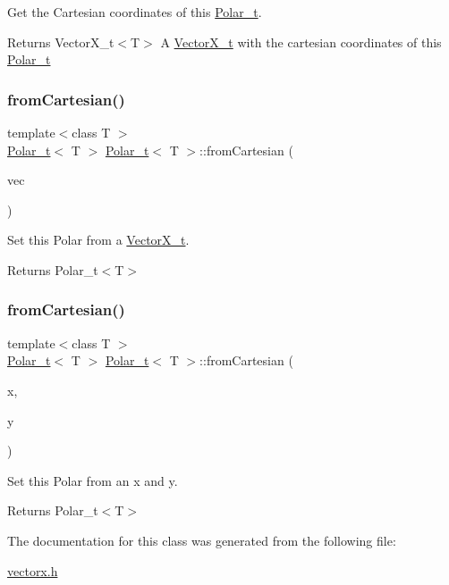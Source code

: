 Get the Cartesian coordinates of this \hyperlink{class_polar__t}{Polar\+\_\+t}. 

\begin{DoxyReturn}{Returns}
Vector\+X\+\_\+t$<$\+T$>$ A \hyperlink{class_vector_x__t}{Vector\+X\+\_\+t} with the cartesian coordinates of this \hyperlink{class_polar__t}{Polar\+\_\+t} 
\end{DoxyReturn}
\mbox{\label{class_polar__t_a7a7ea302869a50342c010083943a2dbc}} 
\subsubsection{\texorpdfstring{from\+Cartesian()}{fromCartesian()}\hspace{0.1cm}{\footnotesize\ttfamily [1/2]}}
{\footnotesize\ttfamily template$<$class T $>$ \\
\hyperlink{class_polar__t}{Polar\+\_\+t}$<$ T $>$ \hyperlink{class_polar__t}{Polar\+\_\+t}$<$ T $>$\+::from\+Cartesian (\begin{DoxyParamCaption}\item[{const \hyperlink{class_vector_x__t}{Vector\+X\+\_\+t}$<$ T $>$ \&}]{vec }\end{DoxyParamCaption})}



Set this Polar from a \hyperlink{class_vector_x__t}{Vector\+X\+\_\+t}. 

\begin{DoxyReturn}{Returns}
Polar\+\_\+t$<$\+T$>$ 
\end{DoxyReturn}
\mbox{\label{class_polar__t_a18fa5c39eddf7f3554ddcec7ea95eb27}} 
\subsubsection{\texorpdfstring{from\+Cartesian()}{fromCartesian()}\hspace{0.1cm}{\footnotesize\ttfamily [2/2]}}
{\footnotesize\ttfamily template$<$class T $>$ \\
\hyperlink{class_polar__t}{Polar\+\_\+t}$<$ T $>$ \hyperlink{class_polar__t}{Polar\+\_\+t}$<$ T $>$\+::from\+Cartesian (\begin{DoxyParamCaption}\item[{T}]{x,  }\item[{T}]{y }\end{DoxyParamCaption})}



Set this Polar from an x and y. 

\begin{DoxyReturn}{Returns}
Polar\+\_\+t$<$\+T$>$ 
\end{DoxyReturn}


The documentation for this class was generated from the following file\+:\begin{DoxyCompactItemize}
\item 
\hyperlink{vectorx_8h}{vectorx.\+h}\end{DoxyCompactItemize}
